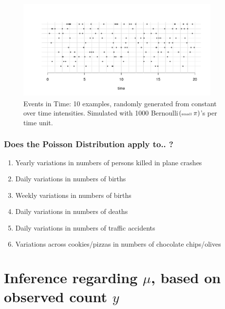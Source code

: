 \documentclass[handout]{beamer}\usepackage[]{graphicx}\usepackage[]{color}
\begin{document}
\begin{frame}
\frametitle{}
\begin{figure}[h]
\begin{center}
\includegraphics[width=4in,height=2in]{timeStrips63.pdf}
\caption{Events in Time: 10 examples, randomly generated from constant over time intensities. Simulated with 1000 Bernoulli$(\tiny{\textrm{small }\pi})$'s per time unit.}
\end{center}
\end{figure}
\end{frame}


\begin{frame}
\frametitle{Does the Poisson Distribution apply to.. ?}

\begin{enumerate}
\setlength\itemsep{0.9em}
\item Yearly variations in numbers of persons killed in	plane crashes 
\item Daily variations in numbers of births
\item Weekly variations in numbers of births
\item Daily variations in numbers of deaths
\item Daily variations in numbers of traffic accidents
\item Variations across cookies/pizzas in numbers of chocolate chips/olives
\end{enumerate}
\end{frame}




\section{Inference regarding $\mu$, based on observed count $y$}
\end{document}
